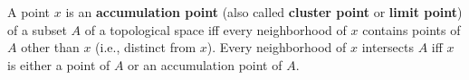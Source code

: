 A point $x$ is an \textbf{accumulation point} (also called \textbf{cluster point} or \textbf{limit point}) of a subset $A$ of a topological space iff every neighborhood of $x$ contains points of $A$ other than $x$ (i.e., distinct from $x$). Every neighborhood of $x$ intersects $A$ iff $x$ is either a point of $A$ or an accumulation point of $A$.
